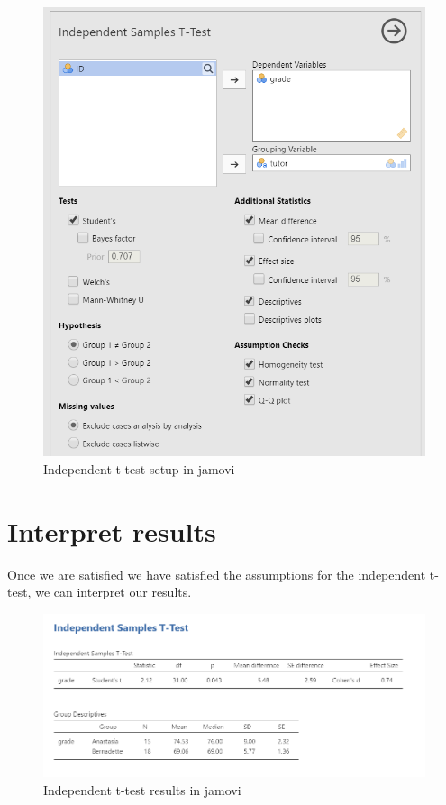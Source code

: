 \documentclass[
]{book}
\begin{document}
\begin{figure}

{\centering \includegraphics[width=0.8\linewidth]{images/02-independent_t-test/independent_t-test_setup} 

}

\caption{Independent t-test setup in jamovi}\label{fig:unnamed-chunk-7}
\end{figure}

\hypertarget{interpret-results}{%
\section{Interpret results}\label{interpret-results}}

Once we are satisfied we have satisfied the assumptions for the independent t-test, we can interpret our results.

\begin{figure}

{\centering \includegraphics[width=1\linewidth]{images/02-independent_t-test/independent_t-test_ind-results} 

}

\caption{Independent t-test results in jamovi}\label{fig:unnamed-chunk-8}
\end{figure}
\end{document}
